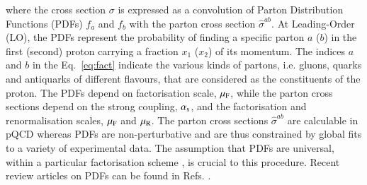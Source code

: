 where the cross section $\sigma$
is expressed
as a convolution of Parton Distribution Functions (PDFs) $f_a$ and $f_b$
with the parton cross section
$\hat{\sigma}^{ab}$.
%
At Leading-Order (LO), the PDFs represent 
the probability of finding a specific parton $a$ ($b$) in the first (second) proton carrying a fraction $x_1$ ($x_2$) of its momentum.
%
The indices $a$ and $b$ in the Eq.~\ref{eq:fact} indicate the various 
kinds of partons,
i.e. gluons, quarks and antiquarks of different flavours, 
that are considered
as the constituents of the proton.
%
The PDFs depend on factorisation scale, $\mu_\mathrm{F}$, while the parton cross sections depend on the strong coupling,
$\alpha_\mathrm{s}$, and the factorisation and renormalisation scales,
$\mu_\mathrm{F}$ and $\mu_\mathrm{R}$.
%
The parton cross sections $\hat\sigma^{ab}$ are calculable in pQCD whereas
PDFs are non-perturbative and are thus constrained by global fits to a variety of experimental data. The assumption that PDFs are universal, within a particular factorisation scheme \cite{Collins:1981uw,Collins:1983ju,Collins:1985ue,Collins:1989gx,Collins:2011zzd}, is crucial to this procedure.
Recent review articles on PDFs can be found in Refs. \cite{Perez:2012um,Forte:2013wc}. 
%
%

